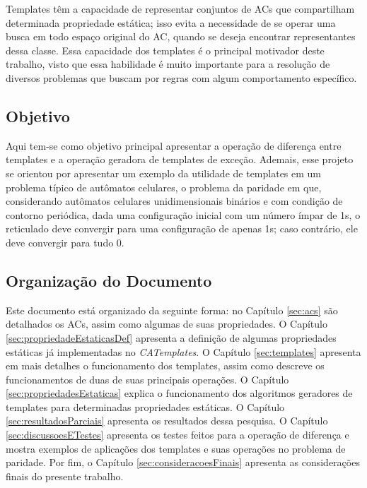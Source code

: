 Templates têm a capacidade de representar conjuntos de ACs que compartilham determinada propriedade estática; isso evita a necessidade de se operar uma busca em todo espaço original do AC, quando se deseja encontrar representantes dessa classe. Essa capacidade dos templates é o principal motivador deste trabalho, visto que essa habilidade é muito importante para a resolução de diversos problemas que buscam por regras com algum comportamento específico.

\subsection{Objetivo}
Aqui tem-se como objetivo principal apresentar a operação de diferença entre templates e a operação geradora de templates de exceção. Ademais, esse projeto se orientou por apresentar um exemplo da utilidade de templates em um problema típico de autômatos celulares, o problema da paridade em que, considerando autômatos celulares unidimensionais binários e com condição de contorno periódica, dada uma configuração inicial com um número ímpar de 1s, o reticulado deve convergir para uma configuração de apenas 1s; caso contrário, ele deve convergir para tudo 0.

\subsection{Organização do Documento}
Este documento está organizado da seguinte forma: no Capítulo \ref{sec:acs} são detalhados os ACs, assim como algumas de suas propriedades. O Capítulo \ref{sec:propriedadeEstaticasDef} apresenta a definição de  algumas propriedades estáticas já implementadas no \textit{CATemplates}. O Capítulo \ref{sec:templates} apresenta em mais detalhes o funcionamento dos templates, assim como descreve os funcionamentos de duas de suas principais operações. O Capítulo \ref{sec:propriedadesEstaticas} explica o funcionamento dos algoritmos geradores de templates para determinadas propriedades estáticas. O Capítulo \ref{sec:resultadosParciais} apresenta os resultados dessa pesquisa. O Capítulo \ref{sec:discussoesETestes} apresenta os testes feitos para a operação de diferença e mostra exemplos de aplicações dos templates e  suas operações no problema de paridade. Por fim, o Capítulo \ref{sec:consideracoesFinais} apresenta as considerações finais do presente trabalho.